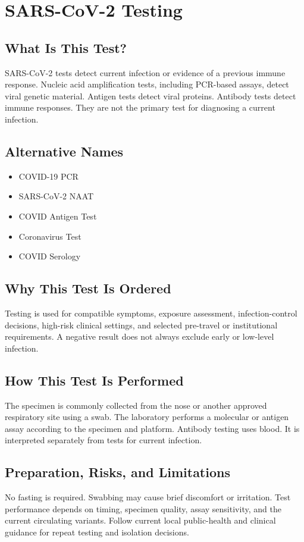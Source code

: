 \chapter{SARS-CoV-2 Testing}

\section*{What Is This Test?}
SARS-CoV-2 tests detect current infection or evidence of a previous immune response. Nucleic acid amplification tests, including PCR-based assays, detect viral genetic material. Antigen tests detect viral proteins. Antibody tests detect immune responses. They are not the primary test for diagnosing a current infection.

\section*{Alternative Names}
\begin{itemize}
  \item COVID-19 PCR
  \item SARS-CoV-2 NAAT
  \item COVID Antigen Test
  \item Coronavirus Test
  \item COVID Serology
\end{itemize}
\section*{Why This Test Is Ordered}
Testing is used for compatible symptoms, exposure assessment, infection-control decisions, high-risk clinical settings, and selected pre-travel or institutional requirements. A negative result does not always exclude early or low-level infection.

\section*{How This Test Is Performed}
The specimen is commonly collected from the nose or another approved respiratory site using a swab. The laboratory performs a molecular or antigen assay according to the specimen and platform. Antibody testing uses blood. It is interpreted separately from tests for current infection.

\section*{Preparation, Risks, and Limitations}
No fasting is required. Swabbing may cause brief discomfort or irritation. Test performance depends on timing, specimen quality, assay sensitivity, and the current circulating variants. Follow current local public-health and clinical guidance for repeat testing and isolation decisions.

